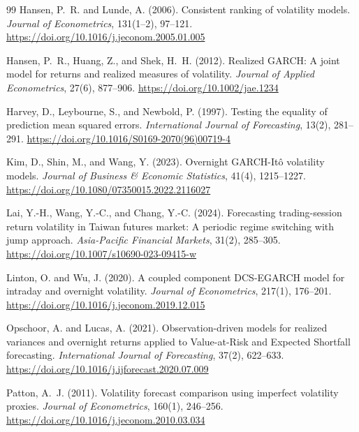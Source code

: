\documentclass[11pt,a4paper]{article}
\begin{document}
\begin{thebibliography}{99}
Hansen, P.~R. and Lunde, A. (2006).
\newblock Consistent ranking of volatility models.
\newblock \emph{Journal of Econometrics}, 131(1--2), 97--121.
\newblock \url{https://doi.org/10.1016/j.jeconom.2005.01.005}

Hansen, P.~R., Huang, Z., and Shek, H.~H. (2012).
\newblock Realized GARCH: A joint model for returns and realized measures of volatility.
\newblock \emph{Journal of Applied Econometrics}, 27(6), 877--906.
\newblock \url{https://doi.org/10.1002/jae.1234}

Harvey, D., Leybourne, S., and Newbold, P. (1997).
\newblock Testing the equality of prediction mean squared errors.
\newblock \emph{International Journal of Forecasting}, 13(2), 281--291.
\newblock \url{https://doi.org/10.1016/S0169-2070(96)00719-4}

Kim, D., Shin, M., and Wang, Y. (2023).
\newblock Overnight GARCH-It\^{o} volatility models.
\newblock \emph{Journal of Business \& Economic Statistics}, 41(4), 1215--1227.
\newblock \url{https://doi.org/10.1080/07350015.2022.2116027}

Lai, Y.-H., Wang, Y.-C., and Chang, Y.-C. (2024).
\newblock Forecasting trading-session return volatility in Taiwan futures market:
A periodic regime switching with jump approach.
\newblock \emph{Asia-Pacific Financial Markets}, 31(2), 285--305.
\newblock \url{https://doi.org/10.1007/s10690-023-09415-w}

Linton, O. and Wu, J. (2020).
\newblock A coupled component DCS-EGARCH model for intraday and overnight volatility.
\newblock \emph{Journal of Econometrics}, 217(1), 176--201.
\newblock \url{https://doi.org/10.1016/j.jeconom.2019.12.015}

Opschoor, A. and Lucas, A. (2021).
\newblock Observation-driven models for realized variances and overnight returns applied to Value-at-Risk and Expected Shortfall forecasting.
\newblock \emph{International Journal of Forecasting}, 37(2), 622--633.
\newblock \url{https://doi.org/10.1016/j.ijforecast.2020.07.009}

Patton, A.~J. (2011).
\newblock Volatility forecast comparison using imperfect volatility proxies.
\newblock \emph{Journal of Econometrics}, 160(1), 246--256.
\newblock \url{https://doi.org/10.1016/j.jeconom.2010.03.034}


\end{thebibliography}
\end{document}
